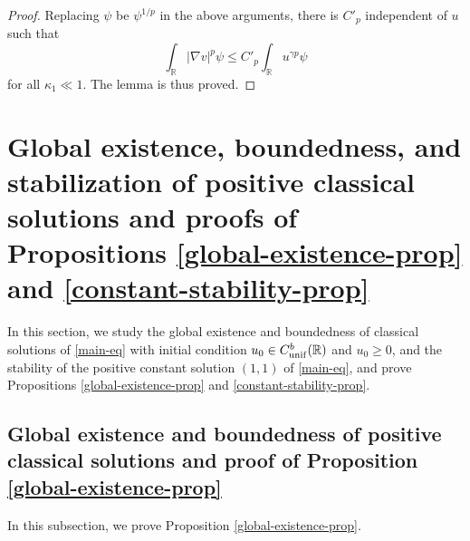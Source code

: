 \documentclass[11pt]{article} %
\theoremstyle{remark}
\theoremstyle{remark}
\numberwithin{equation}{section}
\numberwithin{figure}{section}
\numberwithin{table}{section}
\newcommand\RR{\ensuremath{\mathbb{R}}}
\begin{document}
\begin{proof}
Replacing $\psi$ be $\psi^{1/p}$ in the above arguments, there is $C'_p$ independent of $u$ such that 
$$
\int_{\RR} |\nabla v|^p\psi\le C'_p\int_{\RR}u^{\gamma p}\psi
$$
for all $\kappa_1\ll 1$.
The lemma is thus proved.
    \end{proof}



\section{Global existence, boundedness, and stabilization of positive classical solutions and proofs of Propositions  \ref{global-existence-prop} and
\ref{constant-stability-prop}}
\label{cauchy-problem-section}


In this section, we study the global existence and boundedness of classical solutions of \eqref{main-eq} with 
initial condition $u_0\in C_{\rm unif}^b(\RR)$  and $u_0\ge 0$, and  the stability of the positive constant solution $(1,1)$ of \eqref{main-eq}, and prove Propositions \ref{global-existence-prop} and
\ref{constant-stability-prop}.

\subsection{Global existence and boundedness of positive classical solutions
and
proof of Proposition \ref{global-existence-prop}}

In this subsection, we prove Proposition \ref{global-existence-prop}.
\end{document}
